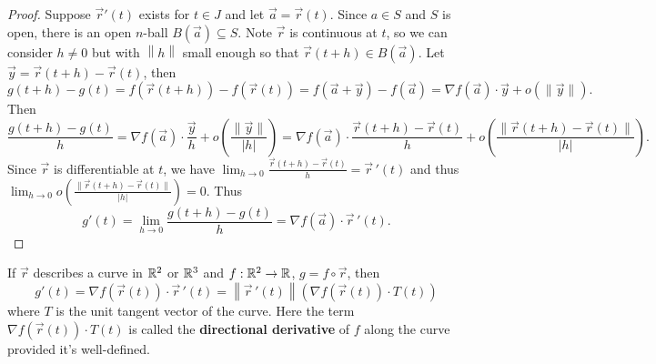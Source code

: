 \documentclass[a4paper]{ctexart}
\begin{document}
    \begin{proof}
        Suppose $\vec r'(t)$ exists for $t\in J$ and let $\vec a = \vec r(t)$. Since $a\in S$ and $S$ is open, there is an open $n$-ball $B(\vec a) \subseteq S$. Note $\vec r$ is continuous at $t$, so we can consider $h\ne 0$ but with $\left\|h\right\|$ small enough so that $\vec r(t+h) \in B(\vec a)$. Let $\vec y = \vec r(t+h) - \vec r(t)$, then
        $$ g(t+h) - g(t) = f(\vec r(t+h)) - f(\vec r(t)) = f(\vec a + \vec y) - f(\vec a) = \nabla f(\vec a) \cdot \vec y + o(\|\vec y\|). $$
        Then
        $$ \frac{g(t+h) - g(t)}{h} = \nabla f(\vec a) \cdot \frac{\vec y}{h} + o\left( \frac{\|\vec y\|}{|h|}\right) = \nabla f(\vec a) \cdot \frac{\vec r(t+h) - \vec r(t)}{h} + o\left( \frac{\|\vec r(t+h) - \vec r(t)\|}{|h|}\right). $$
        Since $\vec r$ is differentiable at $t$, we have $\displaystyle \lim_{h\to 0} \frac{\vec r(t+h) - \vec r(t)}{h} = \vec r\,'(t)$ and thus $\displaystyle \lim_{h\to 0} o\left( \frac{\|\vec r(t+h) - \vec r(t)\|}{|h|}\right) = 0$. Thus
        $$ g'(t) = \lim_{h\to 0} \frac{g(t+h) - g(t)}{h} = \nabla f(\vec a) \cdot \vec r\,'(t). $$
    \end{proof}
    \begin{myex}
        If $\vec r$ describes a curve in $\mathbb{R}^2$ or $\mathbb{R}^3$ and $f:\mathbb{R}^2 \to \mathbb{R}$, $g=f\circ \vec r$, then
        $$ g'(t) = \nabla f(\vec r(t)) \cdot \vec r\,'(t) = \left\|\vec r\,'(t)\right\|\left(\nabla f(\vec r(t)) \cdot T(t)\right) $$
        where $T$ is the unit tangent vector of the curve. Here the term $\nabla f(\vec r(t)) \cdot T(t)$ is called the \textbf{directional derivative} of $f$ along the curve provided it's well-defined.
    \end{myex}
\end{document}
